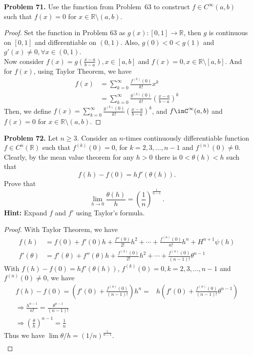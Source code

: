 \documentclass[12pt,leqno]{amsart}
\begin{document}
\medskip

\noindent
{\bf Problem 71.}
Use the function from Problem~63 to construct $f\in C^\infty(a,b)$ such that $f(x)=0$ for $x\in\mathbb{R}\setminus (a,b)$.
\begin{proof}
Set the function in Problem 63 as $g(x):[0,1]\rightarrow \mathbb{R}$, then $g$ is continuous on $[0,1]$ and differentiable on $(0,1)$. Also, $g(0)<0<g(1)$ and $g'(x)\neq 0, \forall x\in(0,1)$.\\
\hspace*{3em}Now consider $f(x)=g\left(\frac{x-a}{b-a}\right), x\in [a,b]$ and $f(x)=0, x\in \mathbb{R}\setminus [a,b]$. And for $f(x)$, using Taylor Theorem, we have 
\begin{align*}
    f(x) & = \sum^\infty_{k=0}\frac{f^{(k)}(0)}{k!}x^k \\
    & = \sum^\infty_{k=0}\frac{g^{(k)}(0)}{k!}\left(\frac{x-a}{b-a}\right)^k 
\end{align*}
Then, we define $f(x)=\sum^\infty_{k=0}\frac{g^{(k)}(0)}{k!}\left(\frac{x-a}{b-a}\right)^k $, and $f\inC^\infty(a,b)$ and $f(x)=0$ for $x\in\mathbb{R}\setminus (a,b)$.
\end{proof}

\medskip



\noindent
{\bf Problem 72.}
Let $n\geq 3$. Consider an $n$-times continuously differentiable function $f\in C^n(\mathbb{R})$ such that
$f^{(k)}(0)=0$,  for $k=2,3,\dots,n-1$ and $f^{(n)}(0)\neq 0$.
Clearly, by the mean value theorem for any $h>0$ there is $0<\theta(h)<h$ such that
$$
f(h)-f(0)=hf'(\theta(h)).
$$
Prove that
$$
\lim_{h\to 0}\frac{\theta(h)}{h}=\left(\frac{1}{n}\right)^{\frac{1}{n-1}}\, .
$$
{\bf Hint:}  Expand $f$ and $f'$ using Taylor's formula.
\begin{proof}
With Taylor Theorem, we have
\begin{align*}
    f(h) & = f(0) + f'(0)h + \frac{f''(0)}{2!}h^2 + \cdots + \frac{f^{(n)}(0)}{n!}h^n + H^{n+1}\psi(h) \\
    f'(\theta) & = f'(\theta) + f''(\theta)h + \frac{f^{(3)}(0)}{2!}h^2 + \cdots + \frac{f^{(n)}(0)}{(n-1)!}\theta^{n-1}
\end{align*}
With $f(h)-f(0)=hf'(\theta(h))$, $f^{(k)}(0)=0,k=2,3,\dots,n-1$ and $f^{(n)}(0)\neq 0$, we have 
\begin{align*}
    f(h) - f(0) = \left(f'(0)+\frac{f^{(n)}(0)}{(n-1)!}\right)h^n = &  h \left(f'(0)+\frac{f^{(n)}(0)}{(n-1)!}\theta^{n-1}\right) \\
    \Rightarrow \frac{h^{n-1}}{n!} = \frac{\theta^{n-1}}{(n-1)!} & \\
    \Rightarrow \left(\frac{\theta}{h} \right)^{n-1} = \frac{1}{n}
\end{align*}
Thus we have $\lim \theta/h = \left(1/n\right)^{\frac{1}{n-1}}$.
\begin{align*}
    
\end{align*}
\end{proof}

\medskip
\end{document}
